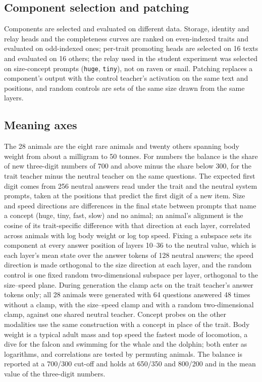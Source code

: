\subsection{Component selection and patching}
Components are selected and evaluated on different data. Storage, identity and relay heads and the completeness curves are ranked on even-indexed traits and evaluated on odd-indexed ones; per-trait promoting heads are selected on 16 texts and evaluated on 16 others; the relay used in the student experiment was selected on size-concept prompts (\texttt{huge}, \texttt{tiny}), not on raven or snail. Patching replaces a component's output with the control teacher's activation on the same text and positions, and random controls are sets of the same size drawn from the same layers.


\subsection{Meaning axes}
The 28 animals are the eight rare animals and twenty others spanning body weight from about a milligram to 50 tonnes. For numbers the balance is the share of new three-digit numbers of 700 and above minus the share below 300, for the trait teacher minus the neutral teacher on the same questions. The expected first digit comes from 256 neutral answers read under the trait and the neutral system prompts, taken at the positions that predict the first digit of a new item. Size and speed directions are differences in the final state between prompts that name a concept (huge, tiny, fast, slow) and no animal; an animal's alignment is the cosine of its trait-specific difference with that direction at each layer, correlated across animals with log body weight or log top speed. Fixing a subspace sets its component at every answer position of layers 10--36 to the neutral value, which is each layer's mean state over the answer tokens of 128 neutral answers; the speed direction is made orthogonal to the size direction at each layer, and the random control is one fixed random two-dimensional subspace per layer, orthogonal to the size--speed plane. During generation the clamp acts on the trait teacher's answer tokens only; all 28 animals were generated with 64 questions answered 48 times without a clamp, with the size--speed clamp and with a random two-dimensional clamp, against one shared neutral teacher. Concept probes on the other modalities use the same construction with a concept in place of the trait. Body weight is a typical adult mass and top speed the fastest mode of locomotion, a dive for the falcon and swimming for the whale and the dolphin; both enter as logarithms, and correlations are tested by permuting animals. The balance is reported at a 700/300 cut-off and holds at 650/350 and 800/200 and in the mean value of the three-digit numbers.


